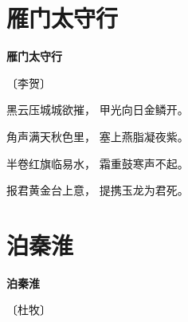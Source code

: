 \documentclass[12pt,UTF-8,openany,fontset=none]{ctexbook}
\begin{document}
\vspace{8pt}
\clearpage

\section{雁门太守行}


\begin{center}
    {\bfseries 雁门太守行}

    \vspace{18pt}

    \begin{large}\xuwen
        〔李贺〕
    \end{large}

\end{center}

    \vspace{18pt}  %

\begin{center}
    \begin{Large}

        黑云压城城欲摧， 甲光向日金鳞开。

        角声满天秋色里， 塞上燕脂凝夜紫。

        半卷红旗临易水， 霜重鼓寒声不起。

        报君黄金台上意， 提携玉龙为君死。

    \end{Large}

\end{center}

\vspace{8pt}
\clearpage

\section{泊秦淮}


\begin{center}
    {\bfseries 泊秦淮}

    \vspace{18pt}

    \begin{large}\xuwen
        〔杜牧〕
    \end{large}

\end{center}

    \vspace{18pt}
\end{document}

